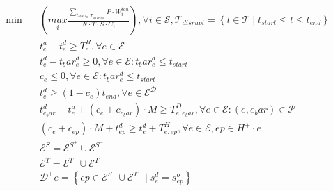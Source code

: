 \begin{align}
  \min\quad & \left(\underset{i}{max} \frac{\sum_{\mathit{tau} \in \mathcal{T}_{d i s r u p t}} P \cdot W_{i}^{\mathit{tau}}}{N \cdot T \cdot S \cdot C_{i}}\right) , \forall i \in \mathcal{S} , \mathcal{T}_{d i s r u p t} = \left\{t \in \mathcal{T} \mid t_{s t a r t} \leq t \leq t_{e n d}\right\} \tag{eq\_0002} \\
  & t_{e}^{a} - t_{e}^{d} \geq T_{e}^{R} , \forall e \in \mathcal{E} \tag{eq\_0003} \\
  & t_{e}^{d} - t_bar_{e}^{d} \geq 0 , \forall e \in \mathcal{E} : t_bar_{e}^{d} \leq t_{s t a r t} \tag{eq\_0005} \\
  & c_{e} \leq 0 , \forall e \in \mathcal{E} : t_bar_{e}^{d} \leq t_{s t a r t} \tag{eq\_0006} \\
  & t_{e}^{d} \geq \left(1 - c_{e}\right) t_{e n d} , \forall e \in \mathcal{E}^{\mathcal{D}} \tag{eq\_0007} \\
  & t_{e_bar}^{d} - t_{e}^{a} + \left(c_{e} + c_{e_bar}\right) \cdot M \geq T_{e , e_bar}^{D} , \forall e \in \mathcal{E} : \left(e , e_bar\right) \in \mathcal{P} \tag{eq\_0008} \\
  & \left(c_{e} + c_{ep}\right) \cdot M + t_{ep}^{d} \geq t_{e}^{d} + T_{e , ep}^{H} , \forall e \in \mathcal{E} , ep \in H^{+} \cdot e \tag{eq\_0010} \\
  & \mathcal{E}^{S} = \mathcal{E}^{S^{+}} \cup \mathcal{E}^{S^{-}} \tag{eq\_0011} \\
  & \mathcal{E}^{T} = \mathcal{E}^{T^{+}} \cup \mathcal{E}^{T^{-}} \tag{eq\_0013} \\
  & \mathcal{D}^{+} e = \left\{ep \in \mathcal{E}^{S^{-}} \cup \mathcal{E}^{T^{-}} \mid s_{e}^{d} = s_{ep}^{o}\right\} \tag{eq\_0014} \\

\end{align}
